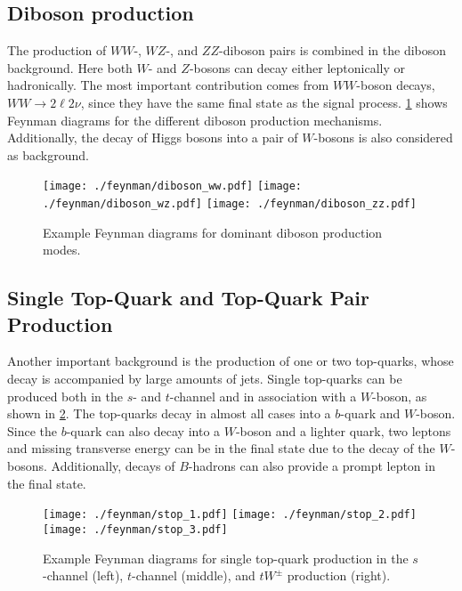 \subsection{Diboson production}\label{sub:processes:diboson}

The production of $WW$-, $WZ$-, and $ZZ$-diboson pairs is combined in the
diboson background.
Here both $W$- and $Z$-bosons can decay either leptonically or hadronically.
The most important contribution comes from $WW$-boson decays, $WW \to 2 \ell 2 \nu$, since they have
the same final state as the signal process.
\cref{fig:processes:diboson} shows Feynman diagrams for the different diboson production mechanisms.
Additionally, the decay of Higgs bosons into a pair of $W$-bosons is also considered as background.

\begin{figure}[htb]
    \centering
    \texttt{[image: ./feynman/diboson\_ww.pdf]}
    \texttt{[image: ./feynman/diboson\_wz.pdf]}
    \texttt{[image: ./feynman/diboson\_zz.pdf]}
    \caption{Example Feynman diagrams for dominant diboson production modes.}\label{fig:processes:diboson}
\end{figure}


\subsection{Single Top-Quark and Top-Quark Pair Production}\label{sub:processes:top}

Another important background is the production of one or two top-quarks, whose decay is accompanied by
large amounts of jets.
Single top-quarks can be produced both in the $s$- and $t$-channel and in association with a $W$-boson, as shown in \cref{fig:processes:stop}.
The top-quarks decay in almost all cases into a $b$-quark and $W$-boson.
Since the $b$-quark can also decay into a $W$-boson and a lighter quark, two leptons and missing transverse energy can be in the final state due to
the decay of the $W$-bosons.
Additionally, decays of $B$-hadrons can also provide a prompt lepton in the final state.

\begin{figure}[htb]
    \centering
    \texttt{[image: ./feynman/stop\_1.pdf]}
    \texttt{[image: ./feynman/stop\_2.pdf]}
    \texttt{[image: ./feynman/stop\_3.pdf]}
    \caption{Example Feynman diagrams for single top-quark production in the $s$-channel (left),
             $t$-channel (middle), and $tW^\pm$ production (right).}\label{fig:processes:stop}
\end{figure}

